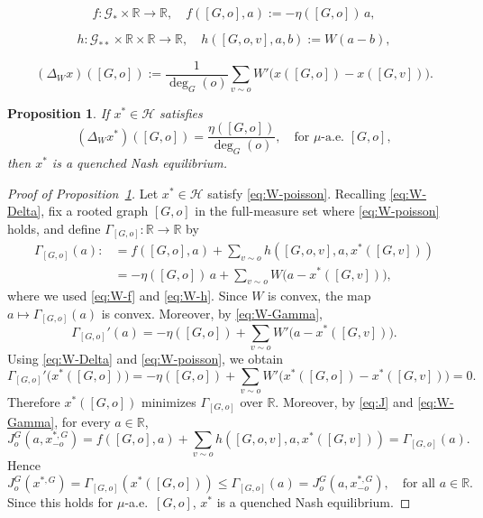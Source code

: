 \documentclass[10pt,a4paper]{amsart}
\newtheorem{proposition}{Proposition}
\newcommand{\R}{{\mathbb R}}
\newcommand{\be}{\begin{equation}}
\newcommand{\ee}{\end{equation}}
\begin{document}
\begin{equation}\label{eq:W-f}
f:\mathcal G_\ast\times\mathbb R\to\mathbb R,
\quad
f([G,o],a):=-\eta([G,o])\,a,
\end{equation}

\begin{equation}\label{eq:W-h}
h:\mathcal G_{\ast\ast}\times\mathbb R\times\mathbb R\to\mathbb R,
\quad
h([G,o,v],a,b):=W(a-b),
\end{equation}

\begin{equation}\label{eq:W-Delta}
(\Delta_W x)([G,o])
:=
\frac1{\deg_G(o)}
\sum_{v\sim o}W'\!\big(x([G,o])-x([G,v])\big).
\end{equation}

\begin{proposition}\label{prop:W-example}
If \(x^\ast\in\mathcal H\) satisfies
\begin{equation}\label{eq:W-poisson}
(\Delta_W x^\ast)([G,o])=\frac{\eta([G,o])}{\deg_G(o)},
\quad \text{for } \mu\text{-a.e. } [G,o],
\end{equation}
then \(x^\ast\) is a quenched Nash equilibrium.
\end{proposition}

\begin{proof}[Proof of Proposition~\ref{prop:W-example}]
Let \(x^\ast\in\mathcal H\) satisfy \eqref{eq:W-poisson}. Recalling \eqref{eq:W-Delta}, fix a rooted graph \([G,o]\) in the full-measure set where \eqref{eq:W-poisson} holds, and define $\Gamma_{[G,o]}:\R\to\R$ by
\be\begin{aligned}\label{eq:W-Gamma}
\Gamma_{[G,o]}(a)
:&=
f([G,o],a)+\sum_{v\sim o}h([G,o,v],a,x^\ast([G,v]))
\\&=
-\eta([G,o])\,a+\sum_{v\sim o}W\!\big(a-x^\ast([G,v])\big),
\end{aligned}\ee
where we used \eqref{eq:W-f} and \eqref{eq:W-h}. Since \(W\) is convex, the map \(a\mapsto \Gamma_{[G,o]}(a)\) is convex. Moreover, by \eqref{eq:W-Gamma},
\[
\Gamma_{[G,o]}'(a)
=
-\eta([G,o])+\sum_{v\sim o}W'\!\big(a-x^\ast([G,v])\big).
\]
Using \eqref{eq:W-Delta} and \eqref{eq:W-poisson}, we obtain
\[
\Gamma_{[G,o]}'\big(x^\ast([G,o])\big)
=
-\eta([G,o])+\sum_{v\sim o}W'\!\big(x^\ast([G,o])-x^\ast([G,v])\big)
=
0.
\]
Therefore \(x^\ast([G,o])\) minimizes \(\Gamma_{[G,o]}\) over \(\mathbb R\). Moreover, by \eqref{eq:J} and \eqref{eq:W-Gamma}, for every \(a\in\mathbb R\),
\[
J_o^G(a,x_{-o}^{\ast,G})
=
f([G,o],a)+\sum_{v\sim o}h([G,o,v],a,x^\ast([G,v]))
=
\Gamma_{[G,o]}(a).
\]
Hence
\[
J_o^G(x^{\ast,G})=\Gamma_{[G,o]}(x^\ast([G,o]))
\le \Gamma_{[G,o]}(a)=J_o^G(a,x_{-o}^{\ast,G}),
\quad \text{for all } a\in\mathbb R.
\]
Since this holds for $\mu$-a.e.~\([G,o]\), \(x^\ast\) is a quenched Nash equilibrium.
\end{proof}
\end{document}
